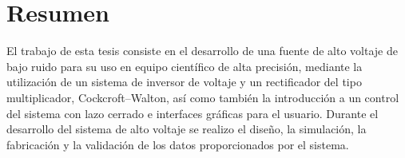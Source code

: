 



\chapter{Resumen} %

El trabajo de esta tesis consiste en el desarrollo de una fuente de alto voltaje de bajo ruido para su uso en equipo científico de alta precisión, mediante la utilización  de un sistema de inversor de voltaje y un rectificador del tipo multiplicador, Cockcroft–Walton, así como también la introducción a un control del sistema con lazo cerrado e interfaces gráficas para el usuario. Durante el desarrollo del sistema de alto voltaje se realizo el diseño, la simulación, la fabricación y la validación de los datos proporcionados por el sistema.\\

